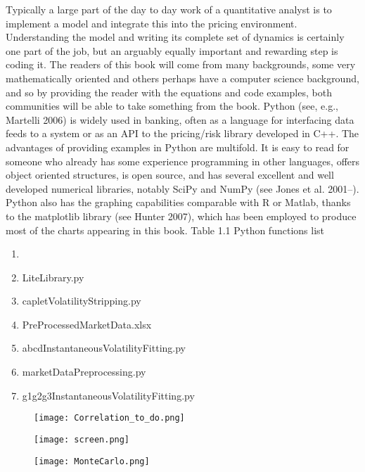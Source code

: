 \documentclass[11pt]{article}
\numberwithin{equation}{subsection}
\begin{document}
\newpage
Typically a large part of the day to day work of a quantitative analyst is to implement a model and integrate this into the pricing environment. Understanding the model and writing its complete set of dynamics is certainly one part of the job, but an arguably equally important and rewarding step is coding it. The readers of this book will come from many backgrounds, some very mathematically oriented and others perhaps have a computer science background, and so by providing the reader with the equations and code examples, both communities will be able to take something from the book. Python (see, e.g., Martelli 2006) is widely used in banking, often as a language for interfacing data feeds to a system or as an API to the pricing/risk library developed in C++. The advantages of providing examples in Python are multifold. It is easy to read for someone who already has some experience programming in other languages, offers object oriented structures, is open source, and has several excellent and well developed numerical libraries, notably SciPy and NumPy (see Jones et al. 2001–). Python also has the graphing capabilities comparable with R or Matlab, thanks to the matplotlib library (see Hunter 2007), which has been employed to produce most of the charts appearing in this book. Table 1.1   Python functions list

\begin{enumerate}
	\item 
	\item LiteLibrary.py
	\item capletVolatilityStripping.py
	\item PreProcessedMarketData.xlsx
	\item abcdInstantaneousVolatilityFitting.py
	\item marketDataPreprocessing.py
	\item g1g2g3InstantaneousVolatilityFitting.py	
\end{enumerate}

\begin{figure}[H]
	\texttt{[image: Correlation\_to\_do.png]}
\end{figure}

\begin{figure}[H]
	\texttt{[image: screen.png]}
\end{figure}

\begin{figure}[H]
	\texttt{[image: MonteCarlo.png]}
\end{figure}
\end{document}
